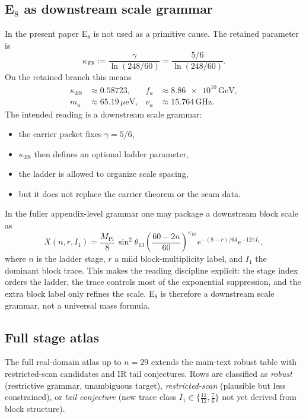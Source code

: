 \documentclass[11pt,a4paper]{article}
\theoremstyle{definition}
\theoremstyle{remark}
\newcommand{\Mplunred}{M_{\mathrm{Pl}}}
\begin{document}
\subsection{\texorpdfstring{E$_8$}{E8} as downstream scale grammar}

In the present paper E$_8$ is not used as a primitive cause. The retained parameter is
\[
\kappa_{E8}:=\frac{\gamma}{\ln(248/60)}=\frac{5/6}{\ln(248/60)}.
\]
On the retained branch this means
\[
\begin{aligned}
\kappa_{E8}&\approx \num{0.58723},
&
f_a&\approx \num{8.86e10}\,\mathrm{GeV},
\\
m_a&\approx \num{65.19}\,\mu\mathrm{eV},
&
\nu_a&\approx \num{15.764}\,\mathrm{GHz}.
\end{aligned}
\]
The intended reading is a downstream scale grammar:
\begin{itemize}[leftmargin=1.5em, topsep=3pt, itemsep=2pt]
    \item the carrier packet fixes $\gamma=5/6$,
    \item $\kappa_{E8}$ then defines an optional ladder parameter,
    \item the ladder is allowed to organize scale spacing,
    \item but it does not replace the carrier theorem or the seam data.
\end{itemize}
In the fuller appendix-level grammar one may package a downstream block scale as
\[
X(n,r,I_1)=\frac{\Mplunred}{8}\,\sin^2\theta_{13}
\left(\frac{60-2n}{60}\right)^{\kappa_{E8}}
e^{-(8-r)/64}e^{-12\pi I_1},
\]
where $n$ is the ladder stage, $r$ a mild block-multiplicity label, and $I_1$ the dominant block trace. This makes the reading discipline explicit: the stage index orders the ladder, the trace controls most of the exponential suppression, and the extra block label only refines the scale. E$_8$ is therefore a downstream scale grammar, not a universal mass formula.

\subsection{Full stage atlas}

The full real-domain atlas up to $n=29$ extends the main-text robust table with restricted-scan candidates and IR tail conjectures. Rows are classified as \emph{robust} (restrictive grammar, unambiguous target), \emph{restricted-scan} (plausible but less constrained), or \emph{tail conjecture} (new trace class $I_1\in\{\frac{11}{12},\frac{7}{6}\}$ not yet derived from block structure).
\end{document}
